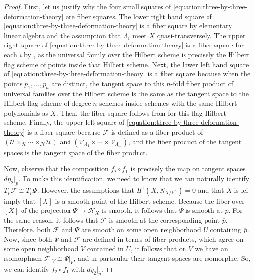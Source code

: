 \documentclass[reqno, 11pt]{amsart}
\theoremstyle{definition}
\theoremstyle{remark}
\numberwithin{equation}{section}
\numberwithin{thm}{section}
\numberwithin{prop}{section}
\numberwithin{lem}{section}
\numberwithin{cor}{section}
\numberwithin{conj}{section}
\numberwithin{defn}{section}
\theoremstyle{plain}
\theoremstyle{definition}
\newcommand\bp{{\mathbb P}}
\newcommand\scf{\mathscr F}
\newcommand\sch{\mathscr H}
\newcommand\scu{\mathscr U}
\newcommand\scv{\mathscr V}
\newcommand \ra{\rightarrow}
\newcommand \hilb[1]{\sch_{#1}}
\newcommand \uhilb[1]{\scv_{#1}}
\begin{document}
\begin{proof}
First, let us justify why the four small squares of \eqref{equation:three-by-three-deformation-theory} are fiber squares.
The lower right hand square of \eqref{equation:three-by-three-deformation-theory} is a fiber square by elementary linear algebra and the assumption that
$\Lambda_i$ meet $X$ quasi-transversely.
The upper right square of \eqref{equation:three-by-three-deformation-theory} is a fiber square for each $i$
by \cite[Remark 4.5.4(ii)]{sernesi:deformations-of-algebraic-schemes},
as the universal family over the Hilbert scheme is precisely the Hilbert flag scheme of points inside that Hilbert scheme.
Next, the lower left hand square of \eqref{equation:three-by-three-deformation-theory} is a fiber
square because when the points $p_1, \ldots, p_n$ are distinct, the tangent space to this
$n$-fold fiber product of universal families over the Hilbert scheme is the same as the tangent space
to the Hilbert flag scheme of degree $n$ schemes inside schemes with the same Hilbert polynomials as $X$.
Then, the fiber square follows from \cite[Remark 4.5.4(ii)]{sernesi:deformations-of-algebraic-schemes} for this flag Hilbert scheme.
Finally, the upper left square of \eqref{equation:three-by-three-deformation-theory} is a fiber square
because $\scf$ is defined as a fiber product of
$(\scu \times_\sch \cdots \times_\sch \scu)$ and $(\uhilb {\Lambda_1} \times \cdots \times \uhilb {\Lambda_m})$,
and the fiber product of the tangent spaces is the tangent space of the fiber product.

Now, observe that the composition $f_2 \circ f_1$ is precisely the map on tangent spaces $d\eta_2|_{\overline{p}}$.
To make this identification, we need to know that we can naturally identify
$T_{\overline p} \scf \cong T_{\overline p}\Psi$.
However, the assumptions that $H^1(X, N_{X/\bp^n}) = 0$
and that $X$ is lci imply that $[X]$ is a smooth point of the Hilbert scheme.
Because the fiber over $[X]$ of the projection $\Psi \ra \hilb X$ is smooth, it follows that $\Psi$ is smooth at $\overline p$.
For the same reason, it follows that $\scf$ is smooth at the corresponding point $\overline p$.
Therefore, both $\scf$ and $\Psi$ are smooth on some open neighborhood $U$ containing
$\overline p$.
Now, since both $\Psi$ and $\scf$ are defined in terms of fiber products, which agree on some open neighborhood $V$
contained in $U$, it follows that on $V$ we have an isomorphism $\scf|_V \cong \Psi|_V$, and in particular their
tangent spaces are isomorphic. So, we can identify $f_2 \circ f_1$ with $d\eta_2|_{\overline{p}}$.


\end{proof}
\end{document}
